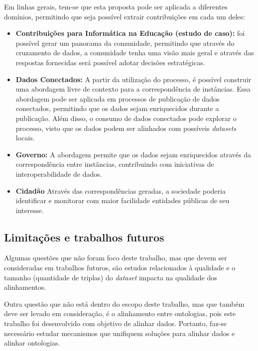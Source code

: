 Em linhas gerais, tem-se que esta proposta pode ser aplicada a diferentes domínios, permitindo que seja possível extrair contribuições em cada um deles:

\begin{itemize}
\item \textbf{Contribuições para Informática na Educação (estudo de caso):} foi possível gerar um panorama da comunidade, permitindo que através do cruzamento de dados, a comunidade tenha uma visão mais geral e através das respostas fornecidas será possível adotar decisões estratégicas.
\item \textbf{Dados Conectados:} A partir da utilização do processo, é possível construir uma abordagem livre de contexto para a correspondência de instâncias. Essa abordagem pode ser aplicada em processos de publicação de dados conectados, permitindo que os dados sejam enriquecidos durante a publicação. Além disso, o consumo de dados conectados pode explorar o processo, visto que os dados podem ser alinhados com possíveis \textit{datasets} locais.
\item \textbf{Governo:} A abordagem permite que os dados sejam enriquecidos através da correspondência entre instâncias, contribuindo com iniciativas de interoperabilidade de dados.
\item \textbf{Cidadão} Através das correspondências geradas, a sociedade poderia identificar e monitorar com maior facilidade entidades públicas de seu interesse.
\end{itemize}
\subsection{Limitações e trabalhos futuros}

Algumas questões que não foram foco deste trabalho, mas que devem ser consideradas em trabalhos futuros, são estudos relacionados à qualidade e o tamanho (quantidade de triplas) do \textit{dataset} impacta na qualidade dos alinhamentos.

Outra questão que não está dentro do escopo deste trabalho, mas que também deve ser levado em consideração, é o alinhamento entre ontologias, pois este trabalho foi desenvolvido com objetivo de alinhar dados. Portanto, faz-se necessário estudar mecanismos que unifiquem soluções para alinhar dados e alinhar ontologias.

